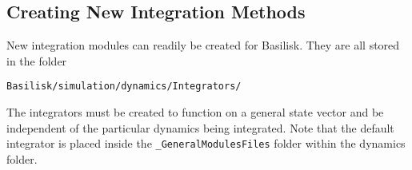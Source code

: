 \subsection{Creating New Integration Methods}
New integration modules can readily be created for Basilisk. They are all stored in the folder
\begin{verbatim}
Basilisk/simulation/dynamics/Integrators/
\end{verbatim}
The integrators must be created to function on a general state vector and be independent of the particular dynamics being integrated. Note that the default integrator is placed inside the {\tt\_GeneralModulesFiles} folder within the dynamics folder.
